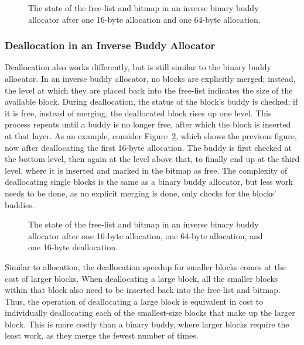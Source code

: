 \begin{figure}[H]
    \centering
    
    \caption{The state of the free-list and bitmap in an inverse binary buddy allocator after one
16-byte allocation and one 64-byte allocation.}
    \label{fig:ibuddyallocated2}
\end{figure}




\subsubsection{Deallocation in an Inverse Buddy Allocator}
Deallocation also works differently, but is still similar to the binary buddy allocator. In an inverse buddy allocator, no blocks are explicitly merged; instead, the level at which they are placed back into the free-list indicates the size of the available block. During deallocation, the status of the block's buddy is checked; if it is free, instead of merging, the deallocated block rises up one level. This process repeats until a buddy is no longer free, after which the block is inserted at that layer. As an example, consider Figure~\ref{fig:ibuddydeallocated}, which shows the previous figure, now after deallocating the first 16-byte allocation. The buddy is first checked at the bottom level, then again at the level above that, to finally end up at the third level, where it is inserted and marked in the bitmap as free. The complexity of deallocating single blocks is the same as a binary buddy allocator, but less work needs to be done, as no explicit merging is done, only checks for the blocks' buddies.

\begin{figure}[H]
    \centering
    
    \caption{The state of the free-list and bitmap in an inverse binary buddy allocator after one
16-byte allocation, one 64-byte allocation, and one 16-byte deallocation.}
    \label{fig:ibuddydeallocated}
\end{figure}

Similar to allocation, the deallocation speedup for smaller blocks comes at the cost of larger blocks. When deallocating a large block, all the smaller blocks within that block also need to be inserted back into the free-list and bitmap. Thus, the operation of deallocating a large block is equivalent in cost to individually deallocating each of the smallest-size blocks that make up the larger block. This is more costly than a binary buddy, where larger blocks require the least work, as they merge the fewest number of times.